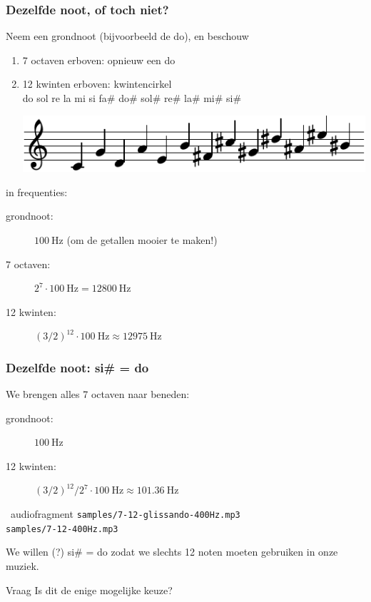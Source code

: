 \documentclass[compress, darktitle, framenumber, totalframenumber, handout]{beamer}
\begin{document}
\begin{frame}
  \frametitle{Dezelfde noot, of toch niet?}

  Neem een grondnoot (bijvoorbeeld de do), en beschouw
  \begin{enumerate}
    \item 7 octaven erboven: opnieuw een do
      \pause
    \item 12 kwinten erboven: \alert{kwintencirkel} \\
      do sol re la mi si fa\# do\# sol\# re\# la\# mi\# si\#

      \includegraphics{scores/circle-cropped}
  \end{enumerate}
  \pause
  in frequenties:
  \begin{description}
    \item[grondnoot:] $\SI{100}{\hertz}$ (om de getallen mooier te maken!)
    \item[7 octaven:] $2^7\cdot\SI{100}{\hertz}=\SI{12800}{\hertz}$ 
      \pause
    \item[12 kwinten:] $(3/2)^{12}\cdot\SI{100}{\hertz}\approx\SI{12975}{\hertz}$
  \end{description}
\end{frame}

\begin{frame}
  \frametitle{Dezelfde noot: si\# = do}

  We brengen alles 7 octaven naar beneden:
  \begin{description}
    \item[grondnoot:] $\SI{100}{\hertz}$
    \item[12 kwinten:] $(3/2)^{12}/2^7\cdot\SI{100}{\hertz}\approx\SI{101.36}{\hertz}$
  \end{description}
  \pause
  \begin{block}{\twonotes\ audiofragment}
    \texttt{samples/7-12-glissando-400Hz.mp3} \\
    \texttt{samples/7-12-400Hz.mp3}
  \end{block}
  \pause
  We willen (?) si\# = do zodat we slechts 12 noten moeten gebruiken in onze muziek.

  \begin{alertblock}{Vraag}
    Is dit de enige mogelijke keuze?
  \end{alertblock}
\end{frame}
\end{document}
